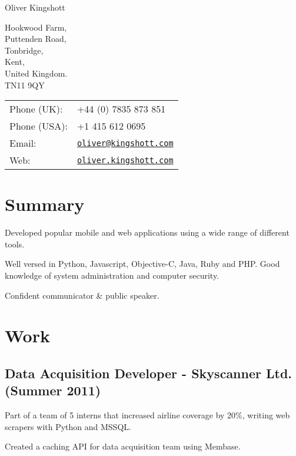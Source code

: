 \documentclass[a4paper]{article}
\def\name{Oliver Kingshott}
\renewenvironment{itemize}{
  \begin{list}{}{
    \setlength{\leftmargin}{1.5em}
  }
}{
  \end{list}
}
\begin{document}
{\huge \name}

\vspace{0.25in}

\begin{minipage}{0.45\linewidth}
  Hookwood Farm, \\
  Puttenden Road, \\
  Tonbridge, \\
  Kent, \\
  United Kingdom. \\
  TN11 9QY
\end{minipage}
\begin{minipage}{0.45\linewidth}
  \begin{tabular}{ll}
    Phone (UK): & +44 (0) 7835 873 851 \\
    Phone (USA): & +1 415 612 0695 \\
    Email: & \href{mailto:oliver@kingshott.com}{\tt oliver@kingshott.com} \\
    Web: & \href{http://oliver.kingshott.com/}{\tt oliver.kingshott.com} \\
  \end{tabular}
\end{minipage}

\section*{Summary}
\begin{itemize}
  \item Developed popular mobile and web applications using a wide range of different tools.
  \item Well versed in Python, Javascript, Objective-C, Java, Ruby and PHP. Good knowledge of system administration and computer security.
  \item Confident communicator \& public speaker.
\end{itemize}

\section*{Work}

\subsection*{Data Acquisition Developer - Skyscanner Ltd. (Summer 2011)}
\begin{itemize}
  \item Part of a team of 5 interns that increased airline coverage by 20\%, writing web scrapers with Python and MSSQL.
  \item Created a caching API for data acquisition team using Membase.
\end{itemize}
\end{document}
